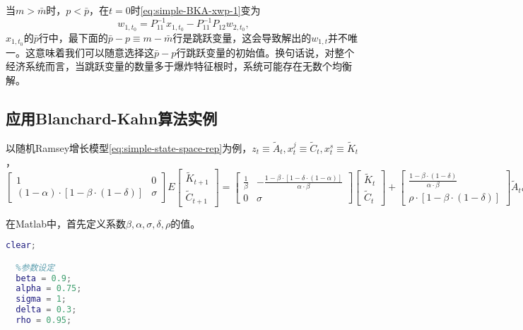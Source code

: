 当$m>\bar{m}$时，$p<\bar{p}$，在$t=0$时\eqref{eq:simple-BKA-xwp-1}变为
\begin{equation*}
  w_{1,t_0}=P_{11}^{-1}x_{1,t_0}-P_{11}^{-1}P_{12}w_{2,t_0},
\end{equation*}
$x_{1,t_0}$的$\bar{p}$行中，最下面的$\bar{p}-p \equiv m - \bar{m}$行是跳跃变量，这会导致解出的$w_{1,t}$并不唯一。这意味着我们可以随意选择这$\bar{p}-p$行跳跃变量的初始值。换句话说，对整个经济系统而言，当跳跃变量的数量多于爆炸特征根时，系统可能存在无数个均衡解。

\subsection{应用Blanchard-Kahn算法实例}
以随机Ramsey增长模型\eqref{eq:simple-state-space-rep}为例，$z_t \equiv \tilde{A}_t, x_t^j \equiv \tilde{C}_t, x_t^s \equiv \tilde{K}_t$，
\begin{equation*}
\begin{bmatrix}
  1 & 0 \\
  (1-\alpha) \cdot [1-\beta \cdot (1-\delta)] & \sigma
\end{bmatrix}
E
\begin{bmatrix}
  \tilde{K}_{t+1} \\
  \tilde{C}_{t+1}
\end{bmatrix}
= \begin{bmatrix}
\frac{1}{\beta} & -\frac{1-\beta \cdot \left[1-\delta \cdot (1-\alpha) \right]}{\alpha \cdot \beta} \\
0 & \sigma
\end{bmatrix}
\begin{bmatrix}
  \tilde{K}_{t} \\
  \tilde{C}_{t}
\end{bmatrix} +
\begin{bmatrix}
  \frac{1-\beta \cdot (1-\delta)}{\alpha \cdot \beta} \\
  \rho \cdot \left[ 1-\beta \cdot (1-\delta) \right]
\end{bmatrix}
\tilde{A}_t。
\end{equation*}

在Matlab中，首先定义系数$\beta, \alpha, \sigma, \delta, \rho$的值。
\begin{lstlisting}[language=matlab,frame=single]
  clear;

  %参数设定
  beta = 0.9;
  alpha = 0.75;
  sigma = 1;
  delta = 0.3;
  rho = 0.95;

\end{lstlisting}

